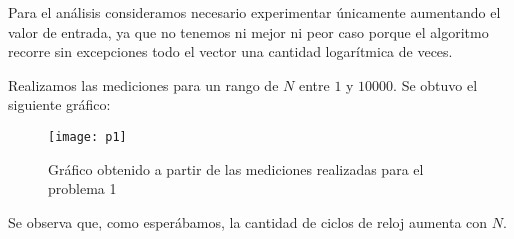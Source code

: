 
Para el análisis consideramos necesario experimentar únicamente aumentando el valor de entrada, ya que no tenemos ni mejor ni peor caso porque el algoritmo recorre sin excepciones todo el vector una cantidad logarítmica de veces. 

Realizamos las mediciones para un rango de $N$ entre $1$ y $10000$. Se obtuvo el siguiente gráfico:

\begin{figure}[h!]
\texttt{[image: p1]}
\caption{Gráfico obtenido a partir de las mediciones realizadas para el problema 1}
\end{figure}

Se observa que, como esperábamos, la cantidad de ciclos de reloj aumenta con $N$.

